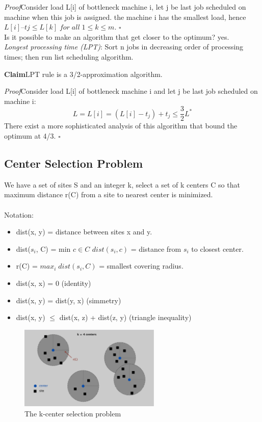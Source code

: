 \documentclass[11pt]{article}
\newenvironment{claim}[1]{\par\textbf{Claim}\space#1}{}
\newenvironment{proof}[1]{\par\textit{Proof}\space#1}{\hfill\ensuremath{\square}}
\begin{document}
\begin{proof}
Consider load L[i] of bottleneck machine i, let j be last job scheduled on machine when this job is assigned. the machine i has the smallest load, hence $L[i]– tj \leq L[k] \; for \; all \; 1 \leq k \leq m$.
\end{proof}\\

Is it possible to make an algorithm that get closer to the optimum? yes.\\
\emph{Longest processing time (LPT)}: Sort n jobs in decreasing order of processing times; then run list scheduling algorithm.\\

\begin{claim}
LPT rule is a 3/2-approximation algorithm.
\end{claim}\\

\begin{proof}
Consider load L[i] of bottleneck machine i and let j be last job scheduled on machine i:
\[ L = L[i] = (L[i] -t_{j}) + t_{j} \leq \frac{3}{2} L^{*}\]
There exist a more sophisticated analysis of this algorithm that bound the optimum at 4/3.
\end{proof}

\subsection{Center Selection Problem}
We have a set of sites S and an integer k, select a set of k centers C so that maximum distance r(C) from a site to nearest center is minimized.\\\\
Notation:
\begin{itemize}
\item{dist(x, y) = distance between sites x and y.}
\item{dist($s_{i}$, C) = min $c \in C$ $dist(s_{i}, c)$ = distance from $s_{i}$ to closest center.}
\item{r(C) = $max_{i} \; dist(s_{i}, C)$ = smallest covering radius.}
\item{dist(x, x) = 0 (identity)} 
\item{dist(x, y) = dist(y, x) (simmetry)} 
\item{dist(x, y) $\leq$ dist(x, z) + dist(z, y) (triangle inequality)}

\end{itemize}

\begin{figure}[H]
		\centering
		\includegraphics[width=0.6\textwidth ]{kCenter}
		\caption{The k-center selection problem}
\end{figure}
\end{document}
